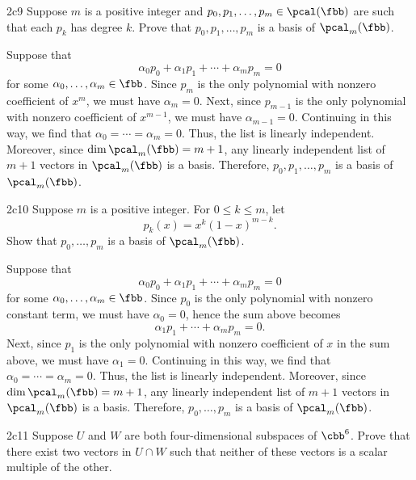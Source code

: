 \begin{exercise}{2c9}
    Suppose $m$ is a positive integer and $p_0, p_1, \ldots, p_m \in \pcal(\fbb)$ are such that each $p_k$ has degree $k$.
	Prove that $p_0, p_1, \ldots, p_m$ is a basis of $\pcal_m(\fbb)$.
\end{exercise}

\begin{sol}
    Suppose that
    \[
    	\alpha_0 p_0 + \alpha_1 p_1 + \cdots + \alpha_m p_m = 0
    \]
    for some $\alpha_0, \ldots, \alpha_m \in \fbb$.
	Since $p_m$ is the only polynomial with nonzero coefficient of $x^m$, we must have $\alpha_m = 0$.
	Next, since $p_{m - 1}$ is the only polynomial with nonzero coefficient of $x^{m - 1}$, we must have $\alpha_{m - 1} = 0$.
	Continuing in this way, we find that $\alpha_0 = \cdots = \alpha_m = 0$.
	Thus, the list is linearly independent.
	Moreover, since $\dim \pcal_m(\fbb) = m + 1$, any linearly independent list of $m + 1$ vectors in $\pcal_m(\fbb)$ is a basis.
	Therefore, $p_0, p_1, \ldots, p_m$ is a basis of $\pcal_m(\fbb)$.
\end{sol}

\begin{exercise}{2c10}
    Suppose $m$ is a positive integer.
	For $0 \leq k \leq m$, let
    \[
    	p_k(x) = x^k(1 - x)^{m - k}.
    \]
    Show that $p_0, \ldots, p_m$ is a basis of $\pcal_m(\fbb)$.
\end{exercise}

\begin{sol}
    Suppose that
    \[
    	\alpha_0 p_0 + \alpha_1 p_1 + \cdots + \alpha_m p_m = 0
    \]
    for some $\alpha_0, \ldots, \alpha_m \in \fbb$.
	Since $p_0$ is the only polynomial with nonzero constant term, we must have $\alpha_0 = 0$, hence the sum above becomes
    \[
    	\alpha_1 p_1 + \cdots + \alpha_m p_m = 0.
    \]
    Next, since $p_1$ is the only polynomial with nonzero coefficient of $x$ in the sum above, we must have $\alpha_1 = 0$.
	Continuing in this way, we find that $\alpha_0 = \cdots = \alpha_m = 0$.
	Thus, the list is linearly independent.
	Moreover, since $\dim \pcal_m(\fbb) = m + 1$, any linearly independent list of $m + 1$ vectors in $\pcal_m(\fbb)$ is a basis.
	Therefore, $p_0, \ldots, p_m$ is a basis of $\pcal_m(\fbb)$.
\end{sol}

\begin{exercise}{2c11}
    Suppose $U$ and $W$ are both four-dimensional subspaces of $\cbb^6$.
	Prove that there exist two vectors in $U \cap W$ such that neither of these vectors is a scalar multiple of the other.
\end{exercise}

